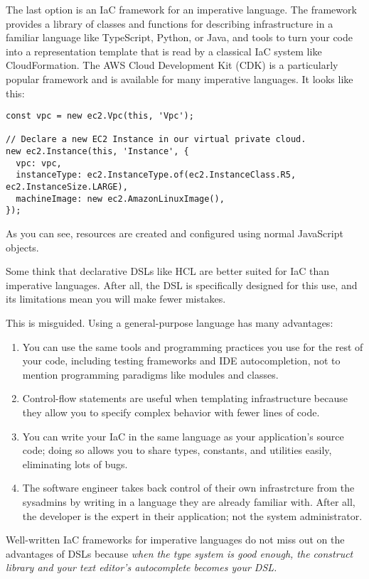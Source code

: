 \documentclass{article}
\begin{document}
The last option is an IaC framework for an imperative language.
The framework provides a library of classes and functions for describing infrastructure in a familiar language like TypeScript, Python, or Java, and tools to turn your code into a representation template that is read by a classical IaC system like CloudFormation.
The AWS Cloud Development Kit (CDK) is a particularly popular framework and is available for many imperative languages.
It looks like this:

\begin{verbatim}
const vpc = new ec2.Vpc(this, 'Vpc');

// Declare a new EC2 Instance in our virtual private cloud.
new ec2.Instance(this, 'Instance', {
  vpc: vpc,
  instanceType: ec2.InstanceType.of(ec2.InstanceClass.R5, ec2.InstanceSize.LARGE),
  machineImage: new ec2.AmazonLinuxImage(),
});
\end{verbatim}

As you can see, resources are created and configured using normal JavaScript objects.

Some think that declarative DSLs like HCL are better suited for IaC than imperative languages.
After all, the DSL is specifically designed for this use, and its limitations mean you will make fewer mistakes.

This is misguided.
Using a general-purpose language has many advantages:

\begin{enumerate}
  \item You can use the same tools and programming practices you use for the rest of your code, including testing frameworks and IDE autocompletion, not to mention programming paradigms like modules and classes.
  \item Control-flow statements are useful when templating infrastructure because they allow you to specify complex behavior with fewer lines of code.
  \item You can write your IaC in the same language as your application's source code; doing so allows you to share types, constants, and utilities easily, eliminating lots of bugs.
  \item The software engineer takes back control of their own infrastrcture from the sysadmins by writing in a language they are already familiar with.
    After all, the developer is the expert in their application; not the system administrator.
\end{enumerate}

Well-written IaC frameworks for imperative languages do not miss out on the advantages of DSLs because \textit{when the type system is good enough, the construct library and your text editor's autocomplete becomes your DSL.}
\end{document}
